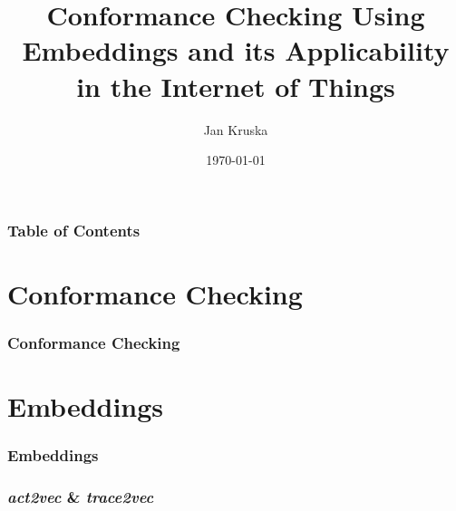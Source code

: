 \documentclass{beamer}
\title{Conformance Checking Using Embeddings and its Applicability in the Internet of Things}
\author{Jan Kruska}
\date{\today}
\begin{document}
	
	\frame{\titlepage}
	
	\begin{frame}
		\frametitle{Table of Contents}
		\tableofcontents
	\end{frame}
	\section{Conformance Checking}
	\begin{frame}
		\frametitle{Conformance Checking}
	\end{frame}
	
	\section{Embeddings}
	\begin{frame}
		\frametitle{Embeddings}
	\end{frame}
	
	
	\begin{frame}
		\frametitle{\emph{act2vec} \& \emph{trace2vec}}
	\end{frame}
	
\end{document}
